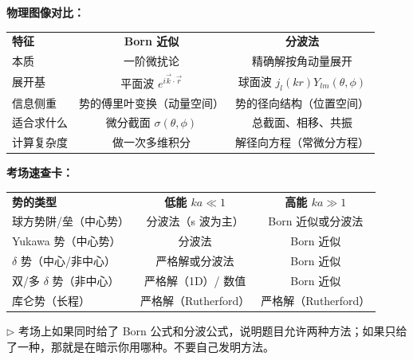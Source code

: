 \begin{derivationbox}
\textbf{物理图像对比：}

\begin{tabular}{lcc}
\textbf{特征} & \textbf{Born 近似} & \textbf{分波法} \\
本质 & 一阶微扰论 & 精确解按角动量展开 \\
展开基 & 平面波 $e^{i\vec{k}\cdot\vec{r}}$ & 球面波 $j_l(kr)Y_{lm}(\theta,\phi)$ \\
信息侧重 & 势的傅里叶变换（动量空间） & 势的径向结构（位置空间） \\
适合求什么 & 微分截面 $\sigma(\theta,\phi)$ & 总截面、相移、共振 \\
计算复杂度 & 做一次多维积分 & 解径向方程（常微分方程） \\
\end{tabular}

\textbf{考场速查卡：}

\begin{tabular}{lcc}
\textbf{势的类型} & \textbf{低能 $ka \ll 1$} & \textbf{高能 $ka \gg 1$} \\
球方势阱/垒（中心势） & 分波法（s 波为主） & Born 近似或分波法 \\
Yukawa 势（中心势） & 分波法 & Born 近似 \\
$\delta$ 势（中心/非中心） & 严格解或分波法 & Born 近似 \\
双/多 $\delta$ 势（非中心） & 严格解（1D）/ 数值 & Born 近似 \\
库仑势（长程） & 严格解（Rutherford） & 严格解（Rutherford） \\
\end{tabular}

$\triangleright$ 考场上如果同时给了 Born 公式和分波公式，说明题目允许两种方法；如果只给了一种，那就是在暗示你用哪种。不要自己发明方法。
\end{derivationbox}

